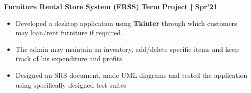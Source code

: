 \documentclass[10pt]{article}
\begin{document}
\vspace{-0.5ex}
\large {\textbf{Furniture Rental Store System (FRSS)}} \normalsize  \href{https://github.com/Abhitipu/FRSS-Software-Lab} {\hspace{0.5ex}\faGithub} {\hfill} \textbf{Term Project | Spr'21}\\[-1.75em]
\begin{itemize}
    \item Developed a desktop application using \textbf{Tkinter} through which customers may loan/rent furniture if required.\\[-1.9em]
    \item The admin may maintain an inventory, add/delete specific items and keep track of his expenditure and profits. \\[-1.9em]
    \item Designed an SRS document, made UML diagrams and tested the application using specifically designed test suites\\[-1em]
\end{itemize}
\vspace{-0.5ex}
\end{document}
